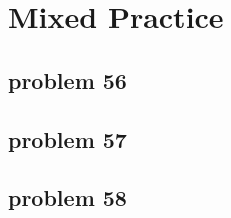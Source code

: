 \section{Mixed Practice}

\subsection{problem 56}


\subsection{problem 57}


\subsection{problem 58}
